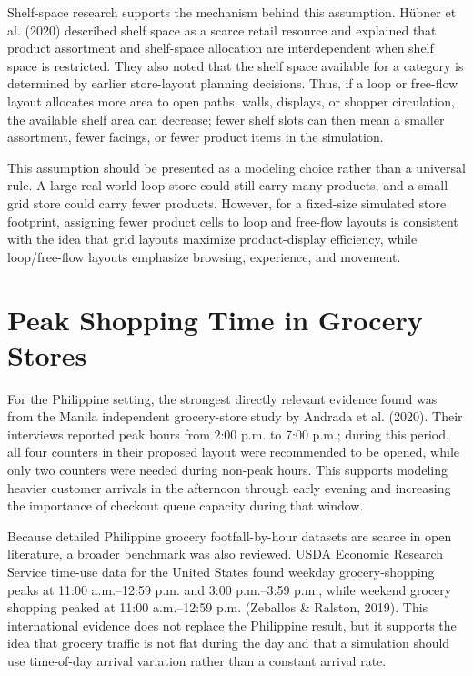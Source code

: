 \documentclass[12pt]{article}
\begin{document}
Shelf-space research supports the mechanism behind this assumption. H\"ubner et al. (2020) described shelf space as a scarce retail resource and explained that product assortment and shelf-space allocation are interdependent when shelf space is restricted. They also noted that the shelf space available for a category is determined by earlier store-layout planning decisions. Thus, if a loop or free-flow layout allocates more area to open paths, walls, displays, or shopper circulation, the available shelf area can decrease; fewer shelf slots can then mean a smaller assortment, fewer facings, or fewer product items in the simulation.

This assumption should be presented as a modeling choice rather than a universal rule. A large real-world loop store could still carry many products, and a small grid store could carry fewer products. However, for a fixed-size simulated store footprint, assigning fewer product cells to loop and free-flow layouts is consistent with the idea that grid layouts maximize product-display efficiency, while loop/free-flow layouts emphasize browsing, experience, and movement.

\section{Peak Shopping Time in Grocery Stores}

For the Philippine setting, the strongest directly relevant evidence found was from the Manila independent grocery-store study by Andrada et al. (2020). Their interviews reported peak hours from 2:00 p.m. to 7:00 p.m.; during this period, all four counters in their proposed layout were recommended to be opened, while only two counters were needed during non-peak hours. This supports modeling heavier customer arrivals in the afternoon through early evening and increasing the importance of checkout queue capacity during that window.

Because detailed Philippine grocery footfall-by-hour datasets are scarce in open literature, a broader benchmark was also reviewed. USDA Economic Research Service time-use data for the United States found weekday grocery-shopping peaks at 11:00 a.m.--12:59 p.m. and 3:00 p.m.--3:59 p.m., while weekend grocery shopping peaked at 11:00 a.m.--12:59 p.m. (Zeballos \& Ralston, 2019). This international evidence does not replace the Philippine result, but it supports the idea that grocery traffic is not flat during the day and that a simulation should use time-of-day arrival variation rather than a constant arrival rate.
\end{document}

